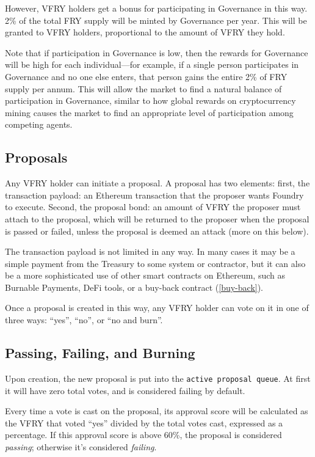 However, VFRY holders get a bonus for participating in Governance in this way. 2\% of the total FRY supply will be minted by Governance per year. This will be granted to VFRY holders, proportional to the amount of VFRY they hold.

Note that if participation in Governance is low, then the rewards for Governance will be high for each individual---for example, if a single person participates in Governance and no one else enters, that person gains the entire 2\% of FRY supply per annum. This will allow the market to find a natural balance of participation in Governance, similar to how global rewards on cryptocurrency mining causes the market to find an appropriate level of participation among competing agents.

\subsection{Proposals} \label{proposals}

Any VFRY holder can initiate a proposal. A proposal has two elements: first, the transaction payload: an Ethereum transaction that the proposer wants Foundry to execute. Second, the proposal bond: an amount of VFRY the proposer must attach to the proposal, which will be returned to the proposer when the proposal is passed or failed, unless the proposal is deemed an attack (more on this below).

The transaction payload is not limited in any way. In many cases it may be a simple payment from the Treasury to some system or contractor, but it can also be a more sophisticated use of other smart contracts on Ethereum, such as Burnable Payments, DeFi tools, or a buy-back contract (\ref{buy-back}).

Once a proposal is created in this way, any VFRY holder can vote on it in one of three ways: ``yes'', ``no'', or ``no and burn''.

\subsection{Passing, Failing, and Burning} \label{passing-failing-burning}

Upon creation, the new proposal is put into the \verb|active proposal queue|. At first it will have zero total votes, and is considered failing by default.

Every time a vote is cast on the proposal, its approval score will be calculated as the VFRY that voted ``yes'' divided by the total votes cast, expressed as a percentage. If this approval score is above 60\%, the proposal is considered \textit{passing}; otherwise it's considered \textit{failing}.

